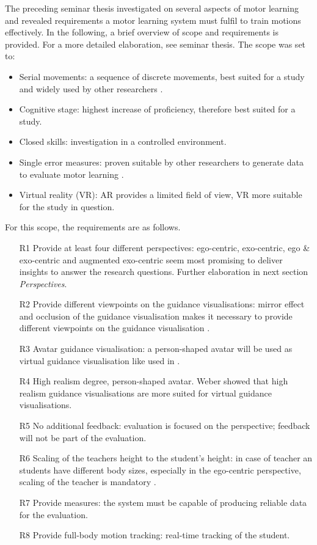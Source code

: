 The preceding seminar thesis investigated on several aspects of motor learning and revealed requirements a motor learning system must fulfil to train motions effectively. In the following, a brief overview of scope and requirements is provided. For a more detailed elaboration, see seminar thesis. The scope was set to:
\begin{itemize}
	\item Serial movements: a sequence of discrete movements, best suited for a study and widely used by other researchers \cite{Anderson2013, Chan2010, Hoang2016}.
	\item Cognitive stage: highest increase of proficiency, therefore best suited for a study.
	\item Closed skills: investigation in a controlled environment.
	\item Single error measures: proven suitable by other researchers to generate data to evaluate motor learning \cite{Sodhi2012, Tang2015, Komura2006}.
	\item Virtual reality (VR): AR provides a limited field of view, VR more suitable for the study in question.
\end{itemize}
For this scope, the requirements are as follows.
\begin{itemize}
	\item[R1] Provide at least four different perspectives: ego-centric, exo-centric, ego \& exo-centric and augmented exo-centric seem most promising to deliver insights to answer the research questions. Further elaboration in next section \textit{Perspectives}.
	\item[R2] Provide different viewpoints on the guidance visualisations: mirror effect and occlusion of the guidance visualisation makes it necessary to provide different viewpoints on the guidance visualisation \cite{Chua}.
	\item[R3] Avatar guidance visualisation: a person-shaped avatar will be used as virtual guidance visualisation like used in \cite{Chua, Komura2006, Han2017}.
	\item[R4] High realism degree, person-shaped avatar. Weber \cite{Weber2018} showed that high realism guidance visualisations are more suited for virtual guidance visualisations.
	\item[R5] No additional feedback: evaluation is focused on the perspective; feedback will not be part of the evaluation.
	\item[R6] Scaling of the teachers height to the student's height: in case of teacher an students have different body sizes, especially in the ego-centric perspective, scaling of the teacher is mandatory \cite{Hoang2016}.
	\item[R7] Provide measures: the system must be capable of producing reliable data for the evaluation.
	\item[R8] Provide full-body motion tracking: real-time tracking of the student.
\end{itemize}

